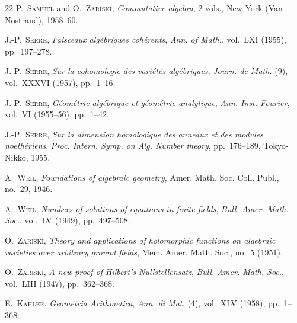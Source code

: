 \begin{thebibliography}{22}
P.~\textsc{Samuel} and O.~\textsc{Zariski},
\emph{Commutative algebra}, 2 vols., New York (Van Nostrand), 1958--60.

J.-P.~\textsc{Serre}, \emph{Faisceaux algébriques cohérents},
\emph{Ann. of Math.}, vol.~LXI (1955), pp.~197--278.

J.-P.~\textsc{Serre},
\emph{Sur la cohomologie des variétés algébriques},
\emph{Journ. de Math.} (9), vol.~XXXVI (1957), pp.~1--16.

J.-P.~\textsc{Serre},
\emph{Géométrie algébrique et géométrie analytique},
\emph{Ann. Inst. Fourier}, vol.~VI (1955--56), pp.~1--42.

J.-P.~\textsc{Serre},
\emph{Sur la dimension homologique des anneaux et des modules noethériens},
\emph{Proc. Intern. Symp. on Alg. Number theory}, pp.~176--189, Tokyo-Nikko,
1955.

A.~\textsc{Weil}, \emph{Foundations of algebraic geometry}, Amer. Math. Soc.
Coll. Publ., no.~29, 1946.

A.~\textsc{Weil}, \emph{Numbers of solutions of equations in finite fields},
\emph{Bull. Amer. Math. Soc.}, vol.~LV (1949), pp.~497--508.

O.~\textsc{Zariski},
\emph{Theory and applications of holomorphic functions on algebraic varieties
over arbitrary ground fields}, Mem. Amer. Math. Soc., no.~5
(1951).

O.~\textsc{Zariski}, \emph{A new proof of Hilbert's Nullstellensatz},
\emph{Bull. Amer. Math. Soc.}, vol.~LIII (1947), pp.~362--368.

E.~\textsc{Kähler}, \emph{Geometria Arithmetica},
\emph{Ann. di Mat.} (4), vol.~XLV (1958), pp.~1--368.

\end{thebibliography}
